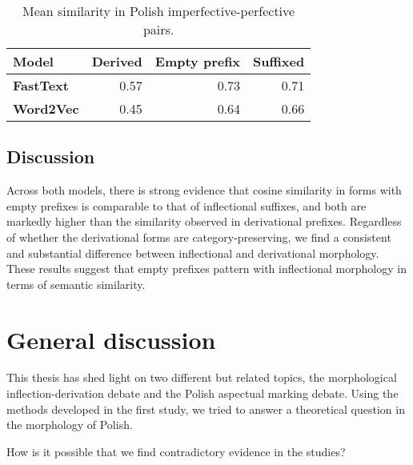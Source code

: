 \documentclass[12pt]{article}
\begin{document}
\begin{table}
    \centering
    \footnotesize
    \label{tbl:aspect-results}
    \begin{tabular}{lrrr}
        \toprule
        \textbf{Model} & \textbf{Derived} & \textbf{Empty prefix} & \textbf{Suffixed} \\
        \midrule
        \textbf{FastText} & 0.57 & 0.73 & 0.71 \\
        \textbf{Word2Vec} & 0.45 & 0.64 & 0.66 \\
        \bottomrule     
    \end{tabular}
    \caption{Mean similarity in Polish imperfective-perfective pairs.}
\end{table}

\subsection{Discussion} \label{discussion2}


Across both models, there is strong evidence that cosine similarity in forms with empty prefixes is comparable to that of inflectional suffixes, and both are markedly higher than the similarity observed in derivational prefixes. Regardless of whether the derivational forms are category-preserving, we find a consistent and substantial difference between inflectional and derivational morphology. These results suggest that empty prefixes pattern with inflectional morphology in terms of semantic similarity.

\section{General discussion} \label{gendiscussion}

This thesis has shed light on two different but related topics, the morphological inflection-derivation debate and the Polish aspectual marking debate. Using the methods developed in the first study, we tried to answer a theoretical question in the morphology of Polish.

How is it possible that we find contradictory evidence in the studies?



\newpage
{}
\sloppy
\printbibliography
\end{document}
